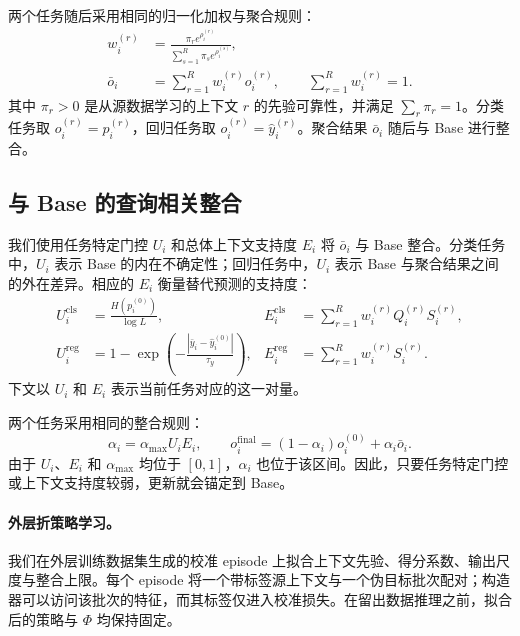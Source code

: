 两个任务随后采用相同的归一化加权与聚合规则：
\begin{equation}
  \begin{aligned}
    w_i^{(r)}&=\frac{\pi_r e^{\rho_i^{(r)}}}
      {\sum_{s=1}^{R}\pi_s e^{\rho_i^{(s)}}},\\
    \bar o_i&=\sum_{r=1}^{R}w_i^{(r)}o_i^{(r)},
    \qquad \sum_{r=1}^{R}w_i^{(r)}=1.
  \end{aligned}
  \label{eq:task_aware_aggregation}
\end{equation}
其中 $\pi_r>0$ 是从源数据学习的上下文 $r$ 的先验可靠性，并满足 $\sum_r\pi_r=1$。分类任务取 $o_i^{(r)}=p_i^{(r)}$，回归任务取 $o_i^{(r)}=\hat y_i^{(r)}$。聚合结果 $\bar o_i$ 随后与 Base 进行整合。

\subsection{与 Base 的查询相关整合}
\label{sec:base_integration}

我们使用任务特定门控 $U_i$ 和总体上下文支持度 $E_i$ 将 $\bar o_i$ 与 Base 整合。分类任务中，$U_i$ 表示 Base 的内在不确定性；回归任务中，$U_i$ 表示 Base 与聚合结果之间的外在差异。相应的 $E_i$ 衡量替代预测的支持度：
\begin{equation}
  \begin{aligned}
    U_i^{\mathrm{cls}}&=\frac{H(p_i^{(0)})}{\log L},
    &E_i^{\mathrm{cls}}&=\sum_{r=1}^{R}w_i^{(r)}Q_i^{(r)}S_i^{(r)},\\
    U_i^{\mathrm{reg}}&=1-\exp\!\left(-\frac{|\bar y_i-\hat y_i^{(0)}|}{\tau_y}\right),
    &E_i^{\mathrm{reg}}&=\sum_{r=1}^{R}w_i^{(r)}S_i^{(r)}.
  \end{aligned}
  \label{eq:context_integration_evidence}
\end{equation}
下文以 $U_i$ 和 $E_i$ 表示当前任务对应的这一对量。

两个任务采用相同的整合规则：
\begin{equation}
  \alpha_i=\alpha_{\max}U_iE_i,
  \qquad o_i^{\mathrm{final}}
  =(1-\alpha_i)o_i^{(0)}+\alpha_i\bar o_i.
  \label{eq:base_anchored_update}
\end{equation}
由于 $U_i$、$E_i$ 和 $\alpha_{\max}$ 均位于 $[0,1]$，$\alpha_i$ 也位于该区间。因此，只要任务特定门控或上下文支持度较弱，更新就会锚定到 Base。

\paragraph{外层折策略学习。}
我们在外层训练数据集生成的校准 episode 上拟合上下文先验、得分系数、输出尺度与整合上限。每个 episode 将一个带标签源上下文与一个伪目标批次配对；构造器可以访问该批次的特征，而其标签仅进入校准损失。在留出数据推理之前，拟合后的策略与 $\Phi$ 均保持固定。

